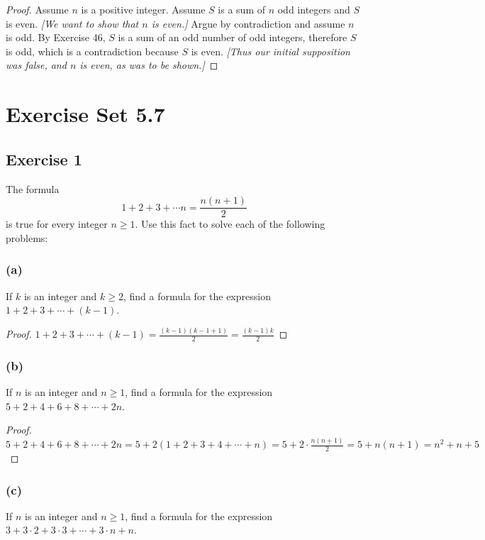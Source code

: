 \documentclass[14pt]{extarticle}
\begin{document}
    \begin{proof}
        Assume $n$ is a positive integer. Assume $S$ is a sum of $n$ odd integers and $S$ is even. {\it [We want to show
                    that $n$ is even.]} Argue by contradiction and assume $n$ is odd. By Exercise 46, $S$ is a sum of an odd number of
        odd integers, therefore $S$ is odd, which is a contradiction because $S$ is even. {\it [Thus our initial
                    supposition was false, and $n$ is even, as was to be shown.]}
    \end{proof}

    \section{Exercise Set 5.7}

    \subsection{Exercise 1}
    The formula
    \[
        1 + 2 + 3 + \cdots n = \frac{n(n+1)}{2}
    \]
    is true for every integer \(n \geq 1\). Use this fact to solve each of the following problems:

    \subsubsection{(a)}
    If $k$ is an integer and \(k \geq 2\), find a formula for
    the expression \(1 + 2 + 3 + \cdots + (k - 1)\).

    \begin{proof}
        \(1 + 2 + 3 + \cdots + (k - 1) = \frac{(k-1)(k-1+1)}{2} = \frac{(k-1)k}{2}\)
    \end{proof}

    \subsubsection{(b)}
    If $n$ is an integer and \(n \geq 1\), find a formula for
    the expression \(5 + 2 + 4 + 6 + 8 + \cdots + 2n\).

    \begin{proof}
        \(5 + 2 + 4 + 6 + 8 + \cdots + 2n = 5 + 2(1 + 2 + 3 + 4 + \cdots + n) = 5 + 2 \cdot \frac{n(n+1)}{2} = 5 + n(n+1) = n^2 + n + 5\)
    \end{proof}

    \subsubsection{(c)}
    If $n$ is an integer and \(n \geq 1\), find a formula for
    the expression \(3 + 3 \cdot 2 + 3 \cdot 3 + \cdots + 3 \cdot n + n\).
\end{document}
